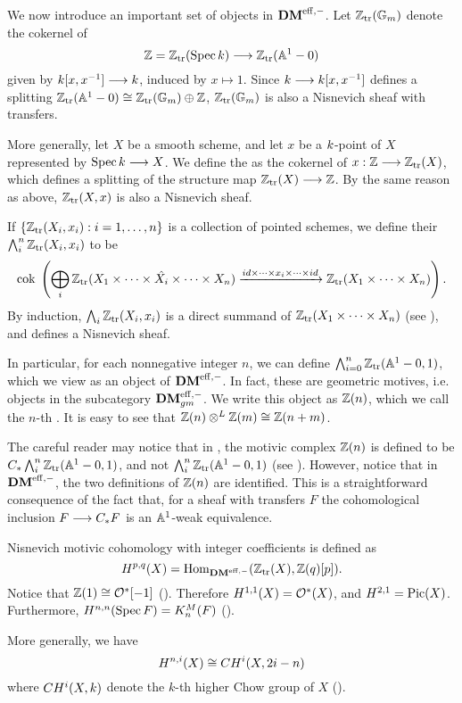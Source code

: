 We now introduce an important set of objects in $\mathbf{DM}^{\mathrm{eff},-}$. Let 
$\mathbb{Z}_{\mathrm{tr}}(\mathbb{G}_m)$ denote the cokernel of
\[
   \mathbb{Z} = \mathbb{Z}_{\mathrm{tr}}(\mathrm{Spec}\, k) \longrightarrow \mathbb{Z}_{\mathrm{tr}}(\mathbb{A}^1 - 0)
\]
given by $k [x, x^{-1}] \longrightarrow k$, induced by
$x \mapsto 1$. Since $k \longrightarrow k[x, x^{-1}]$
defines a splitting $\mathbb{Z}_{\mathrm{tr}}(\mathbb{A}^1 - 0) \cong \mathbb{Z}_{\mathrm{tr}}(\mathbb{G}_m) \oplus \mathbb{Z}$,
$\mathbb{Z}_{\mathrm{tr}}(\mathbb{G}_m)$ is also a Nisnevich sheaf with transfers. 

More generally, let $X$ be a smooth scheme, and let $x$ be a 
$k$-point of $X$ represented by $\mathrm{Spec}\, k \longrightarrow X$. We 
define the  as the 
cokernel of $x: \mathbb{Z} \longrightarrow \mathbb{Z}_{\mathrm{tr}}(X)$, which defines a splitting of the 
structure map $\mathbb{Z}_{\mathrm{tr}}(X) \longrightarrow \mathbb{Z}$. By the same reason as above, 
$\mathbb{Z}_{\mathrm{tr}}(X, x)$ is also a Nisnevich sheaf.

If $\{\mathbb{Z}_{\mathrm{tr}}(X_i, x_i) : i = 1,\dots, n\}$ is a collection of 
pointed schemes, we define their  $\bigwedge_i^n
\mathbb{Z}_{\mathrm{tr}}(X_i, x_i)$ to be
\[
\mathrm{cok}\; \left( \bigoplus_i \mathbb{Z}_{\mathrm{tr}}(X_1 \times \cdots \times \hat{X_i} 
   \times \cdots \times X_n) \xrightarrow{id \times \cdots \times 
      x_i \times \cdots \times id} \mathbb{Z}_{\mathrm{tr}}(X_1 \times \cdots \times 
         X_n)\right).
\]
By induction, $\bigwedge_i \mathbb{Z}_{\mathrm{tr}}(X_i, x_i)$ is a direct summand of
$\mathbb{Z}_{\mathrm{tr}}(X_1 \times \cdots \times X_n)$ (see \cite[2.13]{MVW}),
and defines a Nisnevich sheaf.

In particular, for each nonnegative integer $n$, we can define 
$\bigwedge_{i = 0}^n \mathbb{Z}_{\mathrm{tr}}(\mathbb{A}^1 - 0, 1)$, which we view as an 
object of $\mathbf{DM}^{\mathrm{eff},-}$. In fact, these are geometric motives, i.e.
objects in the subcategory $\mathbf{DM}^{\mathrm{eff},-}_{gm}$. We write this object as
$\mathbb{Z}(n)$, which we call the $n$-th . It is 
easy to see that $\mathbb{Z}(n) \otimes^L \mathbb{Z}(m) \cong \mathbb{Z}(n + m)$. 

\begin{rmk}
  The careful reader may notice that in \cite{MVW}, the motivic
  complex $\mathbb{Z}(n)$ is defined to be $C_{*} \bigwedge_i^n \mathbb{Z}_{\mathrm{tr}}(\mathbb{A}^1 -
  0, 1)$, and not $\bigwedge_i^n \mathbb{Z}_{\mathrm{tr}}(\mathbb{A}^1 - 0, 1)$ (see
  \cite[3.1]{MVW}). However, notice that in $\mathbf{DM}^{\mathrm{eff},-}$, the two
  definitions of $\mathbb{Z}(n)$ are identified. This is a straightforward
  consequence of the fact that, for a sheaf with transfers $F$ the
  cohomological inclusion $F \longrightarrow C_{*} F$ is an $\mathbb{A}^1$-weak
  equivalence.
\end{rmk}

\begin{rmk}\label{rmk_mot_coh}
Nisnevich motivic cohomology with integer coefficients is defined
as
\[
H^{p, q}(X) = \mathrm{Hom}_{\mathbf{DM}^{\mathrm{eff},-}}(\mathbb{Z}_{\mathrm{tr}}(X), \mathbb{Z}(q)[p]).
\]
Notice that $\mathbb{Z}(1) \cong \mathcal{O}^*[-1]$ (\cite[4.1]{MVW}).
Therefore $H^{1,1}(X) = \mathcal{O}^*(X)$, and $H^{2,1} = \mathrm{Pic}(X)$.
Furthermore, $H^{n,n}(\mathrm{Spec}\, F) = K^M_n(F)$ 
(\cite[5.1]{MVW}).

More generally, we have
\[
H^{n, i}(X) \cong CH^i(X, 2i - n)
\]
where $CH^i(X, k)$ denote the $k$-th higher Chow group of $X$
(\cite[19.1]{MVW}).
\end{rmk}

